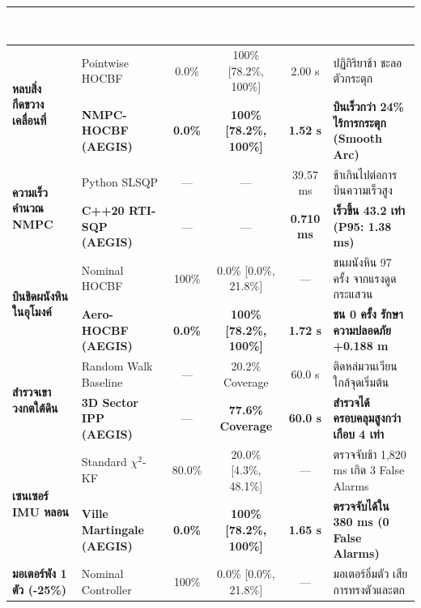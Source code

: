 \documentclass[10pt,a4paper]{article}
\begin{document}
\vspace{4pt}
\begin{table}[h!]
\centering
\small
\renewcommand{\arraystretch}{1.2}
\setlength{\tabcolsep}{5pt}
\begin{tabularx}{\textwidth}{l p{3.2cm} c c c X}
\toprule
\rowcolor{primary}
\textbf{\textcolor{white}{สถานการณ์ทดสอบ}} & \textbf{\textcolor{white}{นโยบายควบคุม}} & \textbf{\textcolor{white}{อัตราการชน}} & \textbf{\textcolor{white}{อัตราสำเร็จ (95\% CI)}} & \textbf{\textcolor{white}{เวลาบิน (s)}} & \textbf{\textcolor{white}{จุดเด่น / ผลลัพธ์สำคัญ}} \\
\midrule
\multirow{2}{*}{\textbf{หลบสิ่งกีดขวางเคลื่อนที่}} & Pointwise HOCBF & 0.0\% & 100\% [78.2\%, 100\%] & 2.00 s & ปฏิกิริยาช้า ชะลอตัวกระตุก \\
& \textbf{NMPC-HOCBF (AEGIS)} & \textbf{0.0\%} & \textbf{100\% [78.2\%, 100\%]} & \textbf{1.52 s} & \textbf{บินเร็วกว่า 24\% ไร้การกระตุก (Smooth Arc)} \\
\midrule
\multirow{2}{*}{\textbf{ความเร็วคำนวณ NMPC}} & Python SLSQP & --- & --- & 39.57 ms & ช้าเกินไปต่อการบินความเร็วสูง \\
& \textbf{C++20 RTI-SQP (AEGIS)} & --- & --- & \textbf{0.710 ms} & \textbf{เร็วขึ้น 43.2 เท่า (P95: 1.38 ms)} \\
\midrule
\multirow{2}{*}{\textbf{บินชิดผนังหินในอุโมงค์}} & Nominal HOCBF & 100\% & 0.0\% [0.0\%, 21.8\%] & --- & ชนผนังหิน 97 ครั้ง จากแรงดูดกระแสวน \\
& \textbf{Aero-HOCBF (AEGIS)} & \textbf{0.0\%} & \textbf{100\% [78.2\%, 100\%]} & \textbf{1.72 s} & \textbf{ชน 0 ครั้ง รักษาความปลอดภัย +0.188 m} \\
\midrule
\multirow{2}{*}{\textbf{สำรวจเขาวงกตใต้ดิน}} & Random Walk Baseline & --- & 20.2\% Coverage & 60.0 s & ติดหล่มวนเวียนใกล้จุดเริ่มต้น \\
& \textbf{3D Sector IPP (AEGIS)} & --- & \textbf{77.6\% Coverage} & \textbf{60.0 s} & \textbf{สำรวจได้ครอบคลุมสูงกว่าเกือบ 4 เท่า} \\
\midrule
\multirow{2}{*}{\textbf{เซนเซอร์ IMU หลอน}} & Standard $\chi^2$-KF & 80.0\% & 20.0\% [4.3\%, 48.1\%] & --- & ตรวจจับช้า 1,820 ms เกิด 3 False Alarms \\
& \textbf{Ville Martingale (AEGIS)} & \textbf{0.0\%} & \textbf{100\% [78.2\%, 100\%]} & \textbf{1.65 s} & \textbf{ตรวจจับได้ใน 380 ms (0 False Alarms)} \\
\midrule
\multirow{2}{*}{\textbf{มอเตอร์พัง 1 ตัว (-25\%)}} & Nominal Controller & 100\% & 0.0\% [0.0\%, 21.8\%] & --- & มอเตอร์อิ่มตัว เสียการทรงตัวและตก \\

\end{tabularx}
\end{table}
\end{document}
